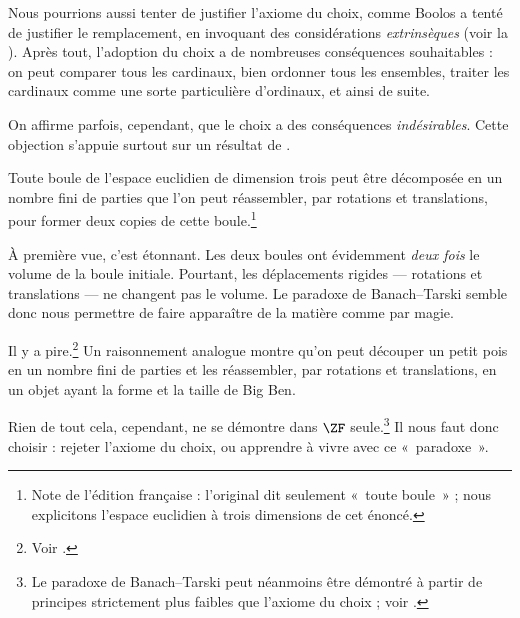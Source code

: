 \documentclass[../../../include/open-logic-section]{subfiles}
\begin{document}

Nous pourrions aussi tenter de justifier
l'axiome du choix, comme Boolos a tenté
de justifier le remplacement, en invoquant
des considérations \emph{extrinsèques}
(voir la ).
Après tout, l'adoption du choix a de
nombreuses conséquences souhaitables :
on peut comparer tous les cardinaux,
bien ordonner tous les ensembles,
traiter les cardinaux comme une sorte
particulière d'ordinaux, et ainsi de suite.

On affirme parfois, cependant, que le choix
a des conséquences \emph{indésirables}.
Cette objection s'appuie surtout sur un
résultat de \cite{BanachTarski1924}.

\begin{thm}
Toute boule de l'espace euclidien de
dimension trois peut être décomposée en
un nombre fini de parties que l'on peut
réassembler, par rotations et translations,
pour former deux copies de cette boule.\footnote{
Note de l'édition française : l'original
dit seulement «~toute boule~» ;
nous explicitons l'espace euclidien
à trois dimensions de cet énoncé.}
\end{thm}
\noindent
À première vue, c'est étonnant.
Les deux boules ont évidemment
\emph{deux fois} le volume de la boule
initiale. Pourtant, les déplacements
rigides — rotations et translations —
ne changent pas le volume. Le paradoxe
de Banach--Tarski semble donc nous
permettre de faire apparaître de la
matière comme par magie.

Il y a pire.\footnote{Voir
\citet[Theorem 3.12]{Wagon2016}.}
Un raisonnement analogue montre
qu'on peut découper un petit pois
en un nombre fini de parties et
les réassembler, par rotations et
translations, en un objet ayant
la forme et la taille de Big Ben.

Rien de tout cela, cependant, ne
se démontre dans $\ZF$ seule.\footnote{
Le paradoxe de Banach--Tarski peut
néanmoins être démontré à partir
de principes strictement plus faibles
que l'axiome du choix ; voir
\citet[303]{Wagon2016}.}
Il nous faut donc choisir : rejeter
l'axiome du choix, ou apprendre à vivre
avec ce «~paradoxe~».
\end{document}
